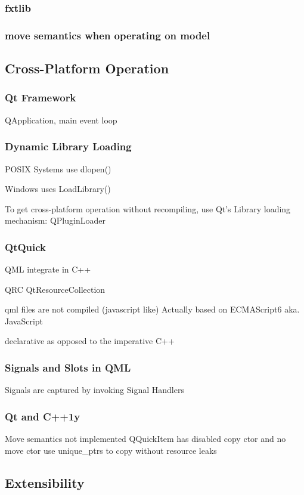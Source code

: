 \subsubsection{fxtlib}
\subsubsection{move semantics when operating on model}

\subsection{Cross-Platform Operation}
\subsubsection{Qt Framework}
QApplication, main event loop

\subsubsection{Dynamic Library Loading}
POSIX Systems use dlopen()

Windows uses LoadLibrary()

To get cross-platform operation without recompiling, use Qt's Library loading mechanism: QPluginLoader

\subsubsection{QtQuick}
QML integrate in C++

QRC QtResourceCollection

qml files are not compiled (javascript like)
Actually based on ECMAScript6 aka. JavaScript

declarative as opposed to the imperative  C++

\subsubsection{Signals and Slots in QML}
Signals are captured by invoking Signal Handlers

\subsubsection{Qt and C++1y}
Move semantics not implemented
QQuickItem has disabled copy ctor and no move ctor
use unique\_ptrs to copy without resource leaks


\subsection{Extensibility}
